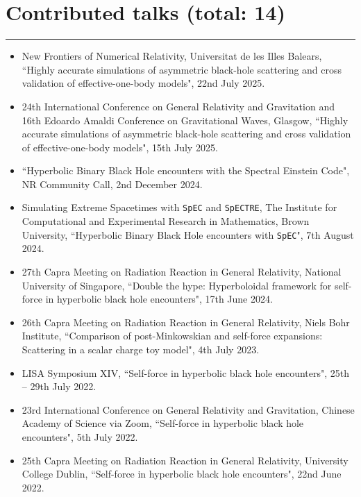 \documentclass[10.5pt, oneside]{article}   	%
\begin{document}
 {\color{Sectioncolour}
\section*{Contributed talks {\rm (total: 14)}}
\vspace{-3mm}
\noindent\rule{\linewidth}{0.6pt}}
\begin{itemize}
\item New Frontiers of Numerical Relativity, Universitat de les Illes Balears, ``Highly accurate simulations of asymmetric black-hole scattering and cross validation of effective-one-body models", 22nd July 2025.
\item 24th International Conference on General Relativity and Gravitation and 16th Edoardo Amaldi Conference on Gravitational Waves, Glasgow, ``Highly accurate simulations of asymmetric black-hole scattering and cross validation of effective-one-body models", 15th July 2025.
\item ``Hyperbolic Binary Black Hole encounters with the Spectral Einstein Code", NR Community Call, 2nd December 2024.
\item Simulating Extreme Spacetimes with \texttt{SpEC} and \texttt{SpECTRE}, The Institute for Computational and Experimental Research in Mathematics, Brown University, ``Hyperbolic Binary Black Hole encounters with \texttt{SpEC}", 7th August 2024.
\item 27th Capra Meeting on Radiation Reaction in General Relativity, National University of Singapore, ``Double the hype: Hyperboloidal framework for self-force in hyperbolic black hole encounters", 17th June 2024.
\item 26th Capra Meeting on Radiation Reaction in General Relativity, Niels Bohr Institute, ``Comparison of post-Minkowskian and self-force expansions: Scattering in a scalar charge toy model", 4th July 2023.
\item LISA Symposium XIV, ``Self-force in hyperbolic black hole encounters", 25th -- 29th July 2022. \href{https://www.youtube.com/watch?v=p2-RgYB6Jhk}{}
\item 23rd International Conference on General Relativity and Gravitation, Chinese Academy of Science via Zoom, ``Self-force in hyperbolic black hole encounters", 5th July 2022. \href{https://www.koushare.com/video/videodetail/30159}{}
\item 25th Capra Meeting on Radiation Reaction in General Relativity, University College Dublin, ``Self-force in hyperbolic black hole encounters", 22nd June 2022. \href{https://oliverlong.info/talks/capra25}{}

\end{itemize}
\end{document}
